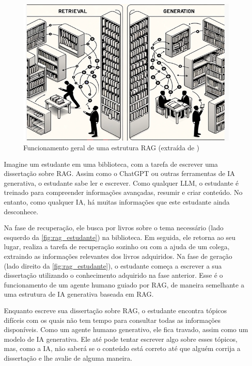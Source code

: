 \documentclass[a4paper, 12pt]{article}
\newcommand{\citeb}[1]{\bibleftbracket\cite{#1}\bibrightbracket}
\begin{document}
    \begin{figure}[h]
        \includegraphics[width=\textwidth,height=0.9\textheight,keepaspectratio]{retrieval-generation-denis-rothman.png}
        \centering
        \caption{Funcionamento geral de uma estrutura RAG (extraída de \citeb{rothman})}
        \centering
        \label{fig:rag_estudante}
    \end{figure}

    Imagine um estudante em uma biblioteca, com a tarefa de escrever uma dissertação sobre RAG. Assim como o ChatGPT ou outras ferramentas de IA generativa, o estudante sabe ler e escrever. Como qualquer LLM, o estudante é treinado para compreender informações avançadas, resumir e criar conteúdo. No entanto, como qualquer IA, há muitas informações que este estudante ainda desconhece.

    Na fase de recuperação, ele busca por livros sobre o tema necessário (lado esquerdo da \autoref{fig:rag_estudante}) na biblioteca. Em seguida, ele retorna ao seu lugar, realiza a tarefa de recuperação sozinho ou com a ajuda de um colega, extraindo as informações relevantes dos livros adquiridos. Na fase de geração (lado direito da \autoref{fig:rag_estudante}), o estudante começa a escrever a sua dissertação utilizando o conhecimento adquirido na fase anterior. Esse é o funcionamento de um agente humano guiado por RAG, de maneira semelhante a uma estrutura de IA generativa baseada em RAG.

    Enquanto escreve sua dissertação sobre RAG, o estudante encontra tópicos difíceis com os quais não tem tempo para consultar todas as informações disponíveis. Como um agente humano generativo, ele fica travado, assim como um modelo de IA generativa. Ele até pode tentar escrever algo sobre esses tópicos, mas, como a IA, não saberá se o conteúdo está correto até que alguém corrija a dissertação e lhe avalie de alguma maneira.
\end{document}
